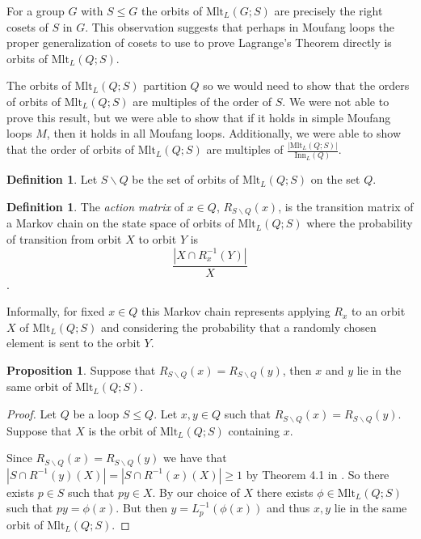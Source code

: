 \documentclass[12pt]{report}
\theoremstyle{definition}
\newtheorem{prp}[thm]{Proposition}
\newtheorem{dfn}[thm]{Definition}
\newcommand{\ldv}{\backslash}       %
\newcommand{\mlt}{\text{Mlt}}       %
\newcommand{\inn}{\text{Inn}}       %
\begin{document}
For a group $G$ with $S\leq G$ the orbits of $\mlt_L(G; S)$ are precisely the right cosets of $S$ in $G$.
  This observation suggests that perhaps in Moufang loops the proper generalization of cosets to use to
  prove Lagrange's Theorem directly is orbits of $\mlt_L(Q; S)$. 

The orbits of $\mlt_L(Q; S)$ partition $Q$ so we would need to show that the orders of orbits of
  $\mlt_L(Q; S)$ are multiples of the order of $S$. We were not able to prove this result, but we
  were able to show that if it holds in simple Moufang loops $M$, then it holds in all Moufang loops.
  Additionally, we were able to show that the order of orbits of $\mlt_L(Q; S)$ are multiples of
  $\frac{|\mlt_L(Q; S)|}{\inn_L(Q)}$.

\begin{dfn}
  Let $S\ldv Q$ be the set of orbits of $\mlt_L(Q; S)$ on the set $Q$.
\end{dfn}

\begin{dfn}
  The \emph{action matrix} of $x\in Q$, $R_{S\ldv Q}(x)$, is the transition matrix of a Markov chain on
    the state space of orbits of $\mlt_L(Q; S)$ where the probability of transition from orbit $X$
    to orbit $Y$ is
  \[\frac{|X\cap R_x^{-1}(Y)|}{X}\]
  \cite{Smith}.
\end{dfn}

Informally, for fixed $x\in Q$ this Markov chain represents applying $R_x$ to an orbit $X$ of $\mlt_L(Q; S)$
  and considering the probability that a randomly chosen element is sent to the orbit $Y$.

\begin{prp}
  Suppose that $R_{S\ldv Q}(x) = R_{S\ldv Q}(y)$, then $x$ and $y$ lie in the same orbit of $\mlt_L(Q; S)$.
\end{prp}

\begin{proof}
  Let $Q$ be a loop $S\leq Q$. Let $x, y\in Q$ such that $R_{S\ldv Q}(x) = R_{S\ldv Q}(y)$. Suppose that $X$
    is the orbit of $\mlt_L(Q; S)$ containing $x$.

  Since $R_{S\ldv Q}(x) = R_{S\ldv Q}(y)$ we have that $|S\cap R^{-1}(y)(X)| = |S\cap R^{-1}(x)(X)| \geq 1$
    by Theorem 4.1 in \cite{Smith}. So there exists $p\in S$ such that $py \in X$. By our choice of $X$
    there exists $\phi\in\mlt_L(Q; S)$ such that $py = \phi(x)$. But then $y = L_p^{-1}(\phi(x))$ and
    thus $x, y$ lie in the same orbit of $\mlt_L(Q; S)$.
\end{proof}
\end{document}
